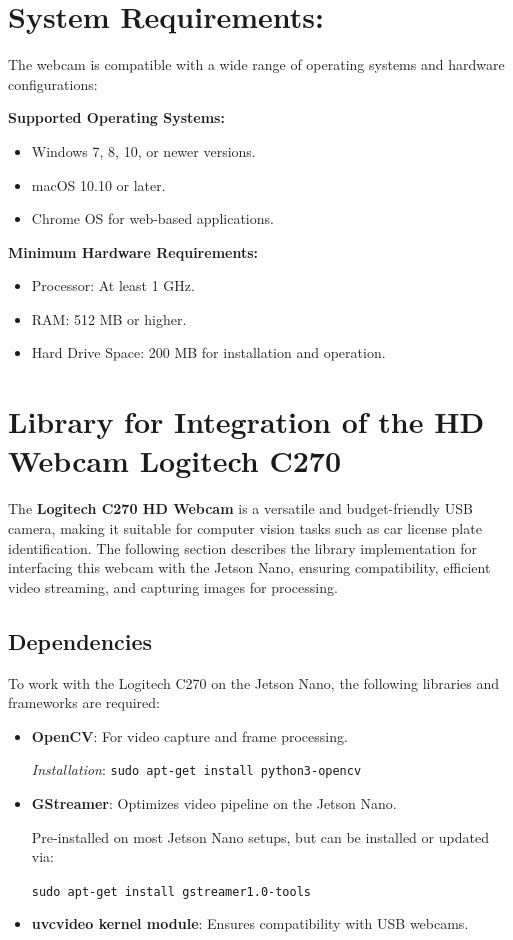 \section{System Requirements:}

The webcam is compatible with a wide range of operating systems and hardware configurations:

\textbf{Supported Operating Systems:}

\begin{itemize}
	\item Windows 7, 8, 10, or newer versions.
	\item macOS 10.10 or later.
	\item Chrome OS for web-based applications.
\end{itemize}

\textbf{Minimum Hardware Requirements:}

\begin{itemize}
	\item Processor: At least 1 GHz.
	\item RAM: 512 MB or higher.
	\item Hard Drive Space: 200 MB for installation and operation.
\end{itemize}

\section{Library for Integration of the HD Webcam Logitech C270}

The \textbf{Logitech C270 HD Webcam} is a versatile and budget-friendly USB camera, making it suitable for computer vision tasks such as car license plate identification. The following section describes the library implementation for interfacing this webcam with the Jetson Nano, ensuring compatibility, efficient video streaming, and capturing images for processing.

\subsection{Dependencies}

To work with the Logitech C270 on the Jetson Nano, the following libraries and frameworks are required:

\begin{itemize}
	\item \textbf{OpenCV}: For video capture and frame processing.

	\textit{Installation}: \texttt{sudo apt-get install python3-opencv}
	\item \textbf{GStreamer}: Optimizes video pipeline on the Jetson Nano.
	
	Pre-installed on most Jetson Nano setups, but can be installed or updated via:
	
	\texttt{sudo apt-get install gstreamer1.0-tools}
	\item \textbf{uvcvideo kernel module}: Ensures compatibility with USB webcams. \cite{UbuntuCommunity:2024}
\end{itemize}

